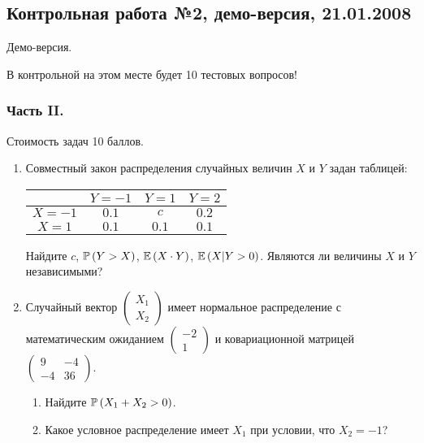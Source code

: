 \subsection{Контрольная работа №2, демо-версия, 21.01.2008}

Демо-версия.

В контрольной на этом месте будет 10 тестовых вопросов!

\subsubsection*{Часть II.}

Стоимость задач 10 баллов.

\begin{enumerate}

\item Совместный закон распределения случайных величин  $X$  и  $Y$
задан таблицей:

\begin{center}
\begin{tabular}{@{}cccc@{}}
\toprule
       & $Y=-1$ & $Y=1$ & $Y=2$ \\ \midrule
$X=-1$ & $0.1$  & $c$   & $0.2$ \\
$X=1$  & $0.1$  & $0.1$ & $0.1$ \\ \bottomrule
\end{tabular}
\end{center}

Найдите  $c$,  $\P\left(Y>X\right)$,  $\E\left(X\cdot Y \right)$,  $\E\left(X|Y>0\right)$. Являются ли величины $X$ и $Y$ независимыми?

\item Случайный вектор  $\left(\begin{array}{c}
{X_{1} } \\ {X_{2} }
\end{array}\right)$  имеет нормальное распределение с
математическим ожиданием  $\left(\begin{array}{c} {-2} \\ {1}
\end{array}\right)$  и ковариационной матрицей
$\left(\begin{array}{cc} {9} & {-4} \\ {-4} & {36}
\end{array}\right)$.
\begin{enumerate}
\item Найдите  $\P\left(X_{1} +X_{2} >0\right)$.
\item Какое условное распределение имеет $X_{1}$ при условии, что $X_{2}=-1$?
\end{enumerate}


\end{enumerate}
